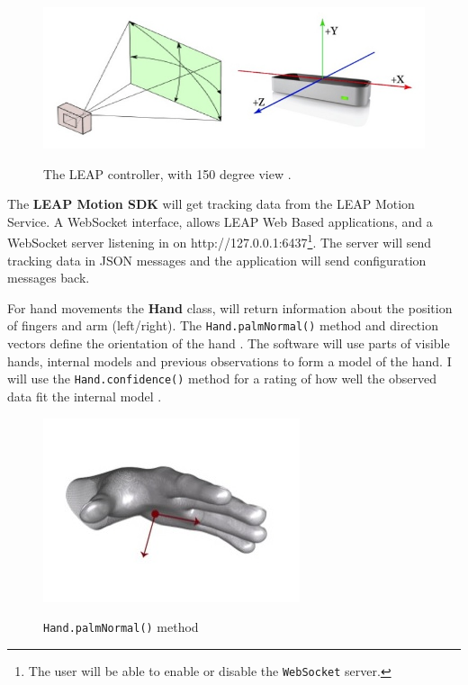 \documentclass[a4paper, 11pt]{article}
\begin{document}
\begin{justify}
\begin{figure}[H]
\begin{center}
\includegraphics[scale=0.4]{leap}\\
\caption{The LEAP controller, with 150 degree view \cite{leap}.}
\end{center}
\end{figure}

The \textbf{LEAP Motion SDK} will get tracking data from the LEAP Motion Service. A WebSocket interface, allows LEAP Web Based applications, and a WebSocket server listening in on http://127.0.0.1:6437\footnote{The user will be able to enable or disable the \texttt{WebSocket} server.}. The server will send tracking data in JSON \cite{json} messages and the application will send configuration messages back. 

For hand movements the \textbf{Hand} class, will return information about the position of fingers and arm (left/right). The \texttt{Hand.palmNormal()} method and direction vectors define the orientation of the hand \cite{leap}. The software will use parts of visible hands, internal models and previous observations to form a model of the hand. I will use the \texttt{Hand.confidence()} method for a rating of how well the observed data fit the internal model \cite{leap}.

\begin{figure}[H]
\begin{center}
\includegraphics[scale=0.4]{palm}\\
\caption{\texttt{Hand.palmNormal()} method \cite{leap}}
\end{center}
\end{figure}


\end{justify}
\end{document}
